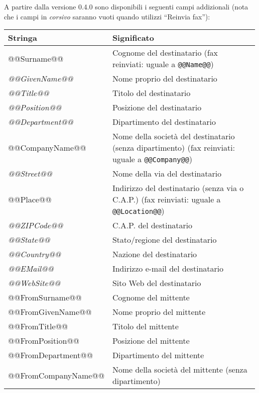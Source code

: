 \documentclass[a4paper,10pt]{scrartcl}
\begin{document}
A partire dalla versione 0.4.0 sono disponibili i seguenti campi addizionali (nota che i campi in \textit{corsivo} saranno vuoti quando utilizzi ``Reinvia fax''):
\begin{center}
\begin{tabular}{|l|p{}|}
\hline
\bfseries Stringa & \bfseries Significato \\
\hline\hline
\ttfamily @@Surname@@ & Cognome del destinatario (fax reinviati: uguale a \texttt{@@Name@@}) \\\hline
\ttfamily\itshape @@GivenName@@ & Nome proprio del destinatario \\\hline
\ttfamily\itshape @@Title@@ & Titolo del destinatario \\\hline
\ttfamily\itshape @@Position@@ & Posizione del destinatario \\\hline
\ttfamily\itshape @@Department@@ & Dipartimento del destinatario\\\hline
\ttfamily @@CompanyName@@ & Nome della società del destinatario (senza dipartimento) (fax reinviati: uguale a \texttt{@@Company@@})\\\hline
\ttfamily\itshape @@Street@@ & Nome della via del destinatario \\\hline
\ttfamily @@Place@@ & Indirizzo del destinatario (senza via o C.A.P.) (fax reinviati: uguale a \texttt{@@Location@@})\\\hline
\ttfamily\itshape @@ZIPCode@@ & C.A.P. del destinatario \\\hline
\ttfamily\itshape @@State@@ & Stato/regione del destinatario\\\hline
\ttfamily\itshape @@Country@@ & Nazione del destinatario\\\hline
\ttfamily\itshape @@EMail@@ & Indirizzo e-mail del destinatario\\\hline
\ttfamily\itshape @@WebSite@@ & Sito Web del destinatario\\\hline\hline
\ttfamily @@FromSurname@@ & Cognome del mittente \\\hline
\ttfamily @@FromGivenName@@ & Nome proprio del mittente \\\hline
\ttfamily @@FromTitle@@ & Titolo del mittente \\\hline
\ttfamily @@FromPosition@@ & Posizione del mittente \\\hline
\ttfamily @@FromDepartment@@ & Dipartimento del mittente\\\hline
\ttfamily @@FromCompanyName@@ & Nome della società del mittente (senza dipartimento)\\\hline

\end{tabular}
\end{center}
\end{document}

